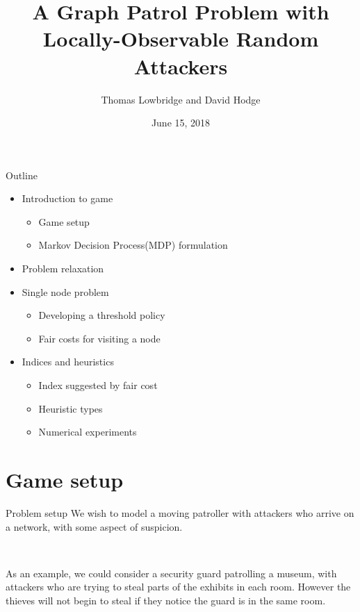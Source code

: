 \documentclass[10pt]{beamer}
\author{Thomas Lowbridge and David Hodge}
\title{A Graph Patrol Problem with Locally-Observable Random Attackers}
\institute{University Of Nottingham,UK}
\date{June 15, 2018}
\begin{document}
\hypertarget{Patrolling games}{}
\begin{frame}
\titlepage
\end{frame}


\begin{frame}{Outline}

\begin{itemize}
\item Introduction to game
\begin{itemize}
\item Game setup
\item Markov Decision Process(MDP) formulation
\end{itemize}
\item Problem relaxation
\item Single node problem
\begin{itemize}
\item Developing a threshold policy
\item Fair costs for visiting a node
\end{itemize}
\item Indices and heuristics
\begin{itemize}
\item Index suggested by fair cost
\item Heuristic types
\item Numerical experiments
\end{itemize}
\end{itemize}
\end{frame}

\section{Game setup}
\begin{frame}{Problem setup}
We wish to model a moving patroller with attackers who arrive on a network, with some aspect of suspicion.

\

As an example, we could consider a security guard patrolling a museum, with attackers who are trying to steal parts of the exhibits in each room. However the thieves will not begin to steal if they notice the guard is in the same room.
\end{frame}
\end{document}
